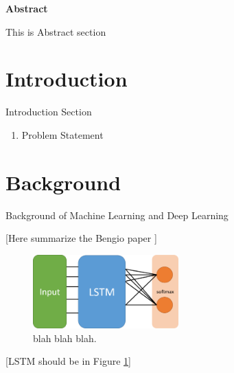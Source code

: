 \documentclass[12pt]{article}
\begin{document}
\maketitle

\begin{center}
\textbf{Abstract}
\end{center}
\noindent
This is Abstract section


\section{Introduction}
Introduction Section
\begin{enumerate}
\item Problem Statement
\end{enumerate}


\section{Background}
Background of Machine Learning and Deep Learning

{\color{blue} [Here summarize the Bengio paper \cite{bengio2009learning}]}

\begin{figure}[t!]
    \centering
    \includegraphics[width=0.5\textwidth]{pictures/FSFNN.png}
    \caption{blah blah blah.}
    \label{fig:lstm}
\end{figure}

{\color{blue} [LSTM should be in Figure \ref{fig:lstm}]}
\end{document}
